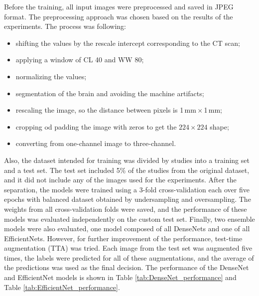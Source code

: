 \documentclass[thesis=B,english]{FITthesis}[2019/12/23]
\begin{document}
Before the training, all input images were preprocessed and saved in JPEG format. The preprocessing approach was chosen based on the results of the experiments. The process was following:
\begin{itemize}
	\item shifting the values by the rescale intercept corresponding to the CT scan;
	\item applying a window of CL 40 and WW 80;
	\item normalizing the values;
	\item segmentation of the brain and avoiding the machine artifacts;
	\item rescaling the image, so the distance between pixels is 1\,mm\,$\times$\,1\,mm;
	\item cropping od padding the image with zeros to get the $224\times224$ shape;
	\item converting from one-channel image to three-channel.
\end{itemize}

Also, the dataset intended for training was divided by studies into a training set and a test set. The test set included 5\% of the studies from the original dataset, and it did not include any of the images used for the experiments. After the separation, the models were trained using a 3-fold cross-validation each over five epochs with balanced dataset obtained by undersampling and oversampling. The weights from all cross-validation folds were saved, and the performance of these models was evaluated independently on the custom test set. Finally, two ensemble models were also evaluated, one model composed of all DenseNets and one of all EfficientNets. However, for further improvement of the performance, test-time augmentation (TTA) was tried. Each image from the test set was augmented five times, the labels were predicted for all of these augmentations, and the average of the predictions was used as the final decision. The performance of the DenseNet and EfficientNet models is shown in Table \ref{tab:DenseNet_performance} and Table \ref{tab:EfficientNet_performance}.
\end{document}
